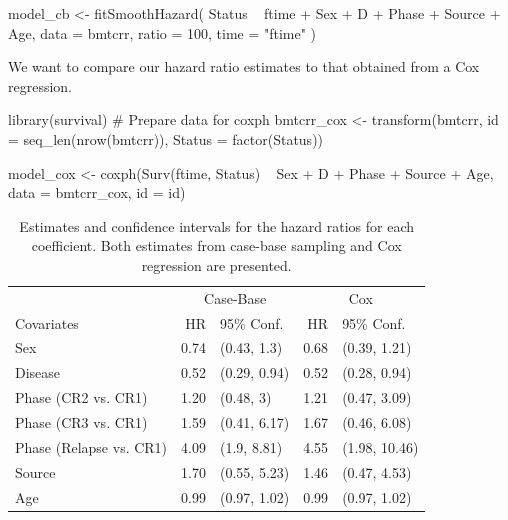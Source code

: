 \begin{Schunk}
\begin{Sinput}
model_cb <- fitSmoothHazard(
  Status ~ ftime + Sex + D + Phase + Source + Age,
  data = bmtcrr,
  ratio = 100,
  time = "ftime"
)
\end{Sinput}
\end{Schunk}

We want to compare our hazard ratio estimates to that obtained from a
Cox regression.

\begin{Schunk}
\begin{Sinput}
library(survival)
# Prepare data for coxph
bmtcrr_cox <- transform(bmtcrr, 
                        id = seq_len(nrow(bmtcrr)),
                        Status = factor(Status))

model_cox <- coxph(Surv(ftime, Status) ~ Sex + D + Phase + Source + Age,
                   data = bmtcrr_cox, id = id)
\end{Sinput}
\end{Schunk}

\begin{Schunk}
\begin{table}

\caption{\label{tab:bmtcrr-cis}Estimates and confidence intervals for the hazard ratios for each coefficient. Both estimates from case-base sampling and Cox regression are presented.}
\centering
\begin{tabular}[t]{lrlrl}
\toprule
\multicolumn{1}{c}{ } & \multicolumn{2}{c}{Case-Base} & \multicolumn{2}{c}{Cox} \\
\cmidrule(l{3pt}r{3pt}){2-3} \cmidrule(l{3pt}r{3pt}){4-5}
Covariates & HR & 95\% Conf. & HR & 95\% Conf.\\
\midrule
Sex & 0.74 & (0.43, 1.3) & 0.68 & (0.39, 1.21)\\
Disease & 0.52 & (0.29, 0.94) & 0.52 & (0.28, 0.94)\\
Phase (CR2 vs. CR1) & 1.20 & (0.48, 3) & 1.21 & (0.47, 3.09)\\
Phase (CR3 vs. CR1) & 1.59 & (0.41, 6.17) & 1.67 & (0.46, 6.08)\\
Phase (Relapse vs. CR1) & 4.09 & (1.9, 8.81) & 4.55 & (1.98, 10.46)\\
\addlinespace
Source & 1.70 & (0.55, 5.23) & 1.46 & (0.47, 4.53)\\
Age & 0.99 & (0.97, 1.02) & 0.99 & (0.97, 1.02)\\
\bottomrule
\end{tabular}
\end{table}

\end{Schunk}

